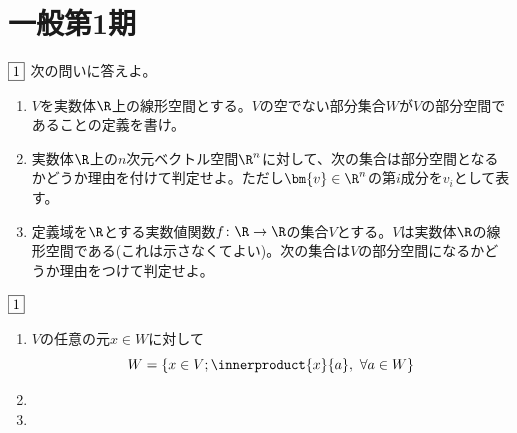\documentclass[dvipdfmx]{jsreport}
\begin{document}
\section{一般第1期}
\begin{tcolorbox} %
	$\fbox{1}$ 次の問いに答えよ。
\begin{enumerate}
	\item $V$を実数体$\R$上の線形空間とする。$V$の空でない部分集合$W$が$V$の部分空間であることの定義を書け。
	\item 実数体$\R$上の$n$次元ベクトル空間$\R^n$に対して、次の集合は部分空間となるかどうか理由を付けて判定せよ。ただし$\bm{v}\in \R^n$の第$i$成分を$v_i$として表す。

	\item 定義域を$\R$とする実数値関数$f\colon \R\to \R$の集合$V$とする。$V$は実数体$\R$の線形空間である(これは示さなくてよい)。次の集合は$V$の部分空間になるかどうか理由をつけて判定せよ。
\end{enumerate}
\end{tcolorbox}

\begin{souanswer} %
	$\fbox{1}$
\begin{enumerate}
	\item $V$の任意の元$x\in W$に対して
\begin{equation*}
	W= \{x\in V; \innerproduct{x}{a},\ \forall a\in W\}
\end{equation*}
	\item 
\begin{enumerate_roman}
	\item 
	\item 
\end{enumerate_roman}
	\item 
\begin{enumerate_roman}
	\item 
	\item 
\end{enumerate_roman}
\end{enumerate}
\end{souanswer}
\end{document}
